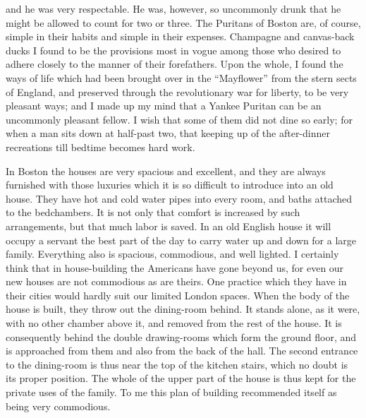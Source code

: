 and he was very respectable.  He was, however, so uncommonly drunk
that he might be allowed to count for two or three.  The Puritans
of Boston are, of course, simple in their habits and simple in
their expenses.  Champagne and canvas-back ducks I found to be the
provisions most in vogue among those who desired to adhere closely
to the manner of their forefathers.  Upon the whole, I found the
ways of life which had been brought over in the ``Mayflower'' from
the stern sects of England, and preserved through the revolutionary
war for liberty, to be very pleasant ways; and I made up my mind
that a Yankee Puritan can be an uncommonly pleasant fellow.  I wish
that some of them did not dine so early; for when a man sits down
at half-past two, that keeping up of the after-dinner recreations
till bedtime becomes hard work.

In Boston the houses are very spacious and excellent, and they are
always furnished with those luxuries which it is so difficult to
introduce into an old house.  They have hot and cold water pipes
into every room, and baths attached to the bedchambers.  It is not
only that comfort is increased by such arrangements, but that much
labor is saved.  In an old English house it will occupy a servant
the best part of the day to carry water up and down for a large
family.  Everything also is spacious, commodious, and well lighted.
I certainly think that in house-building the Americans have gone
beyond us, for even our new houses are not commodious as are
theirs.  One practice which they have in their cities would hardly
suit our limited London spaces.  When the body of the house is
built, they throw out the dining-room behind.  It stands alone, as
it were, with no other chamber above it, and removed from the rest
of the house.  It is consequently behind the double drawing-rooms
which form the ground floor, and is approached from them and also
from the back of the hall.  The second entrance to the dining-room
is thus near the top of the kitchen stairs, which no doubt is its
proper position.  The whole of the upper part of the house is thus
kept for the private uses of the family.  To me this plan of
building recommended itself as being very commodious.

